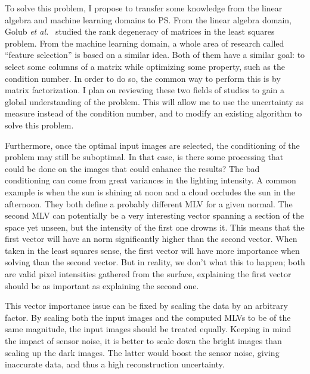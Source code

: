 To solve this problem, I propose to transfer some knowledge from the linear algebra and machine learning domains to PS. From the linear algebra domain, Golub \emph{et al.}~\cite{Golub1977} studied the rank degeneracy of matrices in the least squares problem. From the machine learning domain, a whole area of research called ``feature selection'' is based on a similar idea. Both of them have a similar goal: to select some columns of a matrix while optimizing some property, such as the condition number. In order to do so, the common way to perform this is by matrix factorization. I plan on reviewing these two fields of studies to gain a global understanding of the problem. This will allow me to use the uncertainty as measure instead of the condition number, and to modify an existing algorithm to solve this problem.

Furthermore, once the optimal input images are selected, the conditioning of the problem may still be suboptimal. In that case, is there some processing that could be done on the images that could enhance the results? The bad conditioning can come from great variances in the lighting intensity. A common example is when the sun is shining at noon and a cloud occludes the sun in the afternoon. They both define a probably different MLV for a given normal. The second MLV can potentially be a very interesting vector spanning a section of the space yet unseen, but the intensity of the first one drowns it. This means that the first vector will have an norm significantly higher than the second vector. When taken in the least squares sense, the first vector will have more importance when solving than the second vector. But in reality, we don't what this to happen; both are valid pixel intensities gathered from the surface, explaining the first vector should be as important as explaining the second one.

This vector importance issue can be fixed by scaling the data by an arbitrary factor. By scaling both the input images and the computed MLVs to be of the same magnitude, the input images should be treated equally. Keeping in mind the impact of sensor noise, it is better to scale down the bright images than scaling up the dark images. The latter would boost the sensor noise, giving inaccurate data, and thus a high reconstruction uncertainty.




